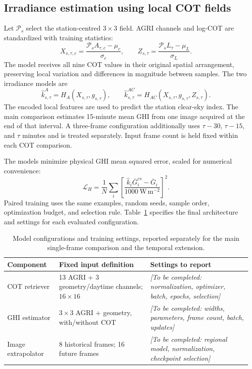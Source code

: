 \documentclass[11pt]{article}
\newcommand{\pending}[1]{\textit{[To be completed: #1]}}
\begin{document}
\subsection{Irradiance estimation using local COT fields}
Let $\mathcal P_s$ select the station-centred $3\times3$ field. AGRI channels and log-COT are standardized with training statistics:
\begin{equation}
X_{s,\tau,c}=\frac{\mathcal P_sA_{\tau,c}-\mu_c}{\sigma_c},\qquad
Z_{s,\tau}=\frac{\mathcal P_sL_\tau-\mu_L}{\sigma_L}.
\label{eq:standardization}
\end{equation}
The model receives all nine COT values in their original spatial arrangement, preserving local variation and differences in magnitude between samples. The two irradiance models are
\begin{equation}
\widehat k^A_{s,\tau}=H_A(X_{s,\tau},g_{s,\tau}),\qquad
\widehat k^{AC}_{s,\tau}=H_{AC}(X_{s,\tau},g_{s,\tau},Z_{s,\tau}).
\label{eq:heads}
\end{equation}
The encoded local features are used to predict the station clear-sky index. The main comparison estimates 15-minute mean GHI from one image acquired at the end of that interval. A three-frame configuration additionally uses $\tau-30$, $\tau-15$, and $\tau$ minutes and is treated separately. Input frame count is held fixed within each COT comparison.

The models minimize physical GHI mean squared error, scaled for numerical convenience:
\begin{equation}
\mathcal L_H=\frac1N\sum_i\left[\frac{\widehat k_i\bar G^{cs}_i-\bar G_i}{1000\ \mathrm{W\,m^{-2}}}\right]^2.
\label{eq:ghi-loss}
\end{equation}
Paired training uses the same examples, random seeds, sample order, optimization budget, and selection rule. Table~\ref{tab:training} specifies the final architecture and settings for each evaluated configuration.
\begin{table}[!htbp]\centering\small
\caption{Model configurations and training settings, reported separately for the main single-frame comparison and the temporal extension.}\label{tab:training}
\begin{tabularx}{\linewidth}{lXX}\toprule
Component & Fixed input definition & Settings to report\\\midrule
COT retriever & 13 AGRI + 3 geometry/daytime channels; $16\times16$ & \pending{normalization, optimizer, batch, epochs, selection}\\
GHI estimator & $3\times3$ AGRI + geometry, with/without COT & \pending{widths, parameters, frame count, batch, updates}\\
Image extrapolator & 8 historical frames; 16 future frames & \pending{regional model, normalization, checkpoint selection}\\\bottomrule
\end{tabularx}\end{table}
\end{document}
